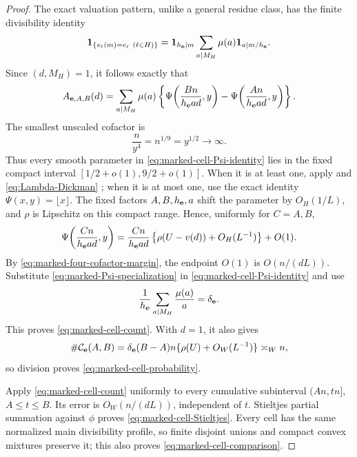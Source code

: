 \documentclass[11pt]{article}
\numberwithin{equation}{section}
\theoremstyle{definition}
\theoremstyle{remark}
\newcommand{\1}{\mathbf 1}
\begin{document}
\begin{proof}
The exact valuation pattern, unlike a general residue class, has the
finite divisibility identity
\begin{equation}
 \1_{\{v_\ell(m)=e_\ell\ (\ell\in H)\}}
 =\1_{h_{\bf e}\mid m}
    \sum_{a\mid M_H}\mu(a)\1_{a\mid m/h_{\bf e}}.
 \label{eq:marked-head-inclusion-exclusion}
\end{equation}
Since \((d,M_H)=1\), it follows exactly that
\begin{align}
 A_{{\bf e},A,B}(d)
 =\sum_{a\mid M_H}\mu(a)
 \left\{\Psi\!\left(\frac{Bn}{h_{\bf e}ad},y\right)
       -\Psi\!\left(\frac{An}{h_{\bf e}ad},y\right)\right\}.
 \label{eq:marked-cell-Psi-identity}
\end{align}
The smallest unscaled cofactor is
\begin{equation}
             \frac n{y^4}=n^{1/9}=y^{1/2}\longrightarrow\infty.
 \label{eq:marked-four-cofactor-margin}
\end{equation}
Thus every smooth parameter in \eqref{eq:marked-cell-Psi-identity} lies in
the fixed compact interval
\([1/2+o(1),9/2+o(1)]\).  When it is at least one, apply
 and \eqref{eq:Lambda-Dickman}
\cite{HildebrandTenenbaum1993,Saias1989}; when it is at most
one, use the exact identity \(\Psi(x,y)=\lfloor x\rfloor\).  The fixed
factors \(A,B,h_{\bf e},a\) shift the parameter by \(O_H(1/L)\), and
\(\rho\) is Lipschitz on this compact range.  Hence, uniformly for
\(C=A,B\),
\begin{equation}
 \Psi\!\left(\frac{Cn}{h_{\bf e}ad},y\right)
 =\frac{Cn}{h_{\bf e}ad}
    \left\{\rho(U-v(d))+O_H(L^{-1})\right\}+O(1).
 \label{eq:marked-Psi-specialization}
\end{equation}
By \eqref{eq:marked-four-cofactor-margin}, the endpoint \(O(1)\) is
\(O(n/(dL))\).  Substitute \eqref{eq:marked-Psi-specialization} in
\eqref{eq:marked-cell-Psi-identity} and use
\[
 \frac1{h_{\bf e}}\sum_{a\mid M_H}\frac{\mu(a)}a
 =\delta_{\bf e}.
\]
This proves \eqref{eq:marked-cell-count}.  With \(d=1\), it also gives
\begin{equation}
 \#\mathcal C_{\bf e}(A,B)
 =\delta_{\bf e}(B-A)n\{\rho(U)+O_W(L^{-1})\}
 \asymp_W n,
 \label{eq:marked-cell-size}
\end{equation}
so division proves \eqref{eq:marked-cell-probability}.

Apply \eqref{eq:marked-cell-count} uniformly to every cumulative
subinterval \((An,tn]\), \(A\le t\le B\).  Its error is
\(O_W(n/(dL))\), independent of \(t\).  Stieltjes partial summation
against \(\phi\) proves \eqref{eq:marked-cell-Stieltjes}.  Every cell has
the same normalized main divisibility profile, so finite disjoint unions
and compact convex mixtures preserve it; this also proves
\eqref{eq:marked-cell-comparison}.
\end{proof}
\end{document}
